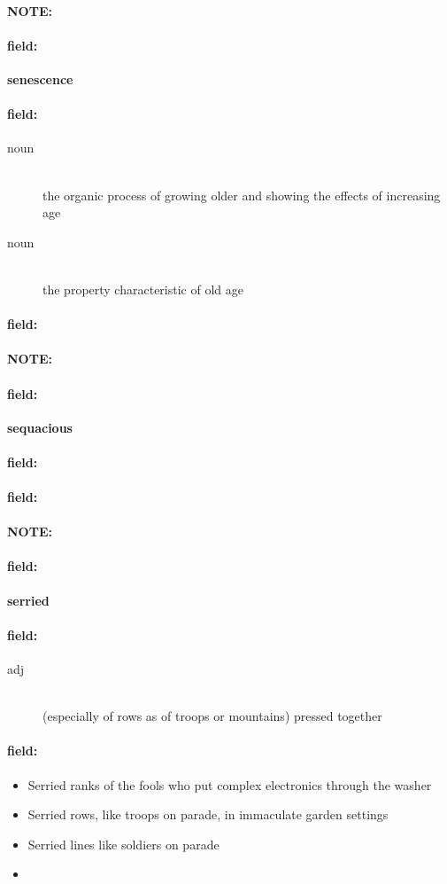 \documentclass[12pt]{article}
\newenvironment{note}{\paragraph{NOTE:}}{}
\newenvironment{field}{\paragraph{field:}}{}
\begin{document}
\begin{note}
\begin{field}
\textbf{\large senescence}
\end{field}


\begin{field}
\begin{description}
\item[noun] \hfill \\ 
the organic process of growing older and showing the effects of increasing age

\item[noun] \hfill \\ 
the property characteristic of old age

\end{description}
\end{field}

\begin{field}
\end{field}
\end{note}
\begin{note}
\begin{field}
\textbf{\large sequacious}
\end{field}


\begin{field}
\end{field}

\begin{field}
\end{field}
\end{note}
\begin{note}
\begin{field}
\textbf{\large serried}
\end{field}


\begin{field}
\begin{description}
\item[adj] \hfill \\ 
(especially of rows as of troops or mountains) pressed together

\end{description}
\end{field}

\begin{field}
\begin{itemize}
\item Serried ranks of the fools who put complex electronics through the washer
\item Serried rows, like troops on parade, in immaculate garden settings
\item Serried lines like soldiers on parade
\item 
\end{itemize}
\end{field}
\end{note}
\end{document}
